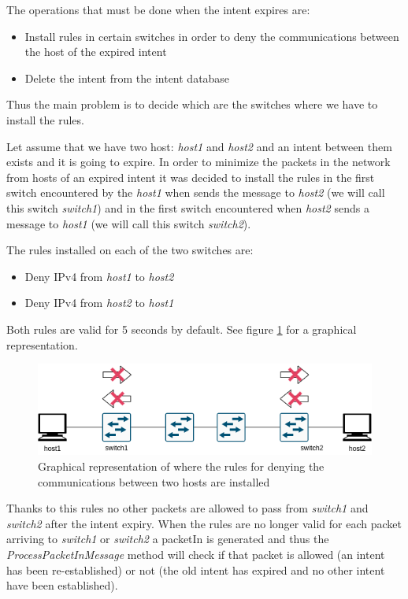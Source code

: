 \documentclass[a4paper]{report}
\begin{document}
	\noindent The operations that must be done when the intent expires are:
	\begin{itemize}
		\item Install rules in certain switches in order to deny the communications between the host of the expired intent
		\item Delete the intent from the intent database
	\end{itemize}

	\noindent Thus the main problem is to decide which are the switches where we have to install the rules.
	
	
	\noindent Let assume that we have two host: \textit{host1} and \textit{host2} and an intent between them exists and it is going to expire. In order to minimize the packets in the network from hosts of an expired intent it was decided to install the rules in the first switch encountered by the \textit{host1} when sends the message to \textit{host2} (we will call this switch \textit{switch1}) and in the first switch encountered when \textit{host2} sends a message to \textit{host1} (we will call this switch \textit{switch2}).
	
	
	\noindent The rules installed on each of the two switches are:
	\begin{itemize}
		\item Deny IPv4 from \textit{host1} to \textit{host2}
		\item Deny IPv4 from \textit{host2} to \textit{host1}
	\end{itemize}
	
	\noindent Both rules are valid for 5 seconds by default. See figure \ref{img:switch12_example} for a graphical representation.
	
	\begin{figure}[htp]
		\centering
		\includegraphics[width=0.7\linewidth]{img/example.png}
		\caption{Graphical representation of where the rules for denying the communications between two hosts are installed}
		\label{img:switch12_example}
	\end{figure}
	
	 \noindent Thanks to this rules no other packets are allowed to pass from \textit{switch1} and \textit{switch2} after the intent expiry. When the rules are no longer valid for each packet arriving to \textit{switch1} or \textit{switch2} a packetIn is generated and thus the \textit{ProcessPacketInMessage} method will check if that packet is allowed (an intent has been re-established) or not (the old intent has expired and no other intent have been established).
	 
\end{document}
